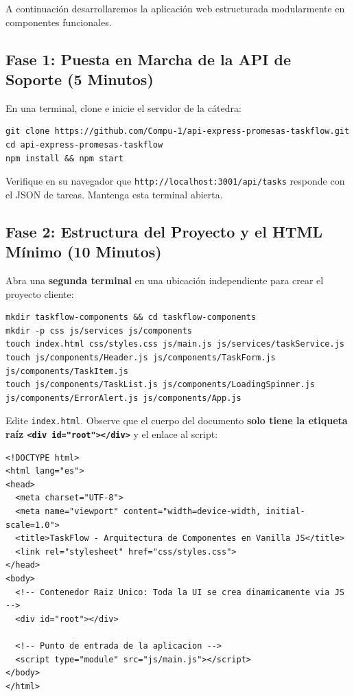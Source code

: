 \documentclass[10pt,letterpaper]{article}
\begin{document}
A continuación desarrollaremos la aplicación web estructurada modularmente en componentes funcionales.

\subsection{Fase 1: Puesta en Marcha de la API de Soporte (5 Minutos)}
En una terminal, clone e inicie el servidor de la cátedra:

\begin{lstlisting}[style=bashstyle]
git clone https://github.com/Compu-1/api-express-promesas-taskflow.git
cd api-express-promesas-taskflow
npm install && npm start
\end{lstlisting}

Verifique en su navegador que \texttt{http://localhost:3001/api/tasks} responde con el JSON de tareas. Mantenga esta terminal abierta.

\subsection{Fase 2: Estructura del Proyecto y el HTML Mínimo (10 Minutos)}
Abra una \textbf{segunda terminal} en una ubicación independiente para crear el proyecto cliente:

\begin{lstlisting}[style=bashstyle]
mkdir taskflow-components && cd taskflow-components
mkdir -p css js/services js/components
touch index.html css/styles.css js/main.js js/services/taskService.js
touch js/components/Header.js js/components/TaskForm.js js/components/TaskItem.js
touch js/components/TaskList.js js/components/LoadingSpinner.js js/components/ErrorAlert.js js/components/App.js
\end{lstlisting}

Edite \texttt{index.html}. Observe que el cuerpo del documento \textbf{solo tiene la etiqueta raíz \texttt{<div id="root"></div>}} y el enlace al script:

\begin{lstlisting}[style=htmlstyle]
<!DOCTYPE html>
<html lang="es">
<head>
  <meta charset="UTF-8">
  <meta name="viewport" content="width=device-width, initial-scale=1.0">
  <title>TaskFlow - Arquitectura de Componentes en Vanilla JS</title>
  <link rel="stylesheet" href="css/styles.css">
</head>
<body>
  <!-- Contenedor Raiz Unico: Toda la UI se crea dinamicamente via JS -->
  <div id="root"></div>

  <!-- Punto de entrada de la aplicacion -->
  <script type="module" src="js/main.js"></script>
</body>
</html>
\end{lstlisting}
\end{document}
